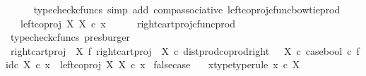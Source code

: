 \begin{isabellebody}
\ \ \ \ \isamarkupfalse%
\ {\isacharparenleft}{\kern0pt}typecheck{\isacharunderscore}{\kern0pt}cfuncs{\isacharcomma}{\kern0pt}\ simp\ add{\isacharcolon}{\kern0pt}\ comp{\isacharunderscore}{\kern0pt}associative{}\ left{\isacharunderscore}{\kern0pt}coproj{\isacharunderscore}{\kern0pt}cfunc{\isacharunderscore}{\kern0pt}bowtie{\isacharunderscore}{\kern0pt}prod{\isacharparenright}{\kern0pt}\isanewline
\ \ \isamarkupfalse%
\ \isamarkupfalse%
\ {\isachardoublequoteopen}{\isachardot}{\kern0pt}{\isachardot}{\kern0pt}{\isachardot}{\kern0pt}\ {\isacharequal}{\kern0pt}\ left{\isacharunderscore}{\kern0pt}coproj\ X\ X\ {\isasymcirc}\isactrlsub c\ x{\isachardoublequoteclose}\isanewline
\ \ \ \ \isamarkupfalse%
\ right{\isacharunderscore}{\kern0pt}cart{\isacharunderscore}{\kern0pt}proj{\isacharunderscore}{\kern0pt}cfunc{\isacharunderscore}{\kern0pt}prod\ \isamarkupfalse%
\ {\isacharparenleft}{\kern0pt}typecheck{\isacharunderscore}{\kern0pt}cfuncs{\isacharcomma}{\kern0pt}\ presburger{\isacharparenright}{\kern0pt}\isanewline
\ \ \isamarkupfalse%
\ \isamarkupfalse%
\ {\isachardoublequoteopen}{\isacharparenleft}{\kern0pt}{\isacharparenleft}{\kern0pt}right{\isacharunderscore}{\kern0pt}cart{\isacharunderscore}{\kern0pt}proj\ {\isasymone}\ X\ {\isasymbowtie}\isactrlsub f\ right{\isacharunderscore}{\kern0pt}cart{\isacharunderscore}{\kern0pt}proj\ {\isasymone}\ X{\isacharparenright}{\kern0pt}\ {\isasymcirc}\isactrlsub c\ dist{\isacharunderscore}{\kern0pt}prod{\isacharunderscore}{\kern0pt}coprod{\isacharunderscore}{\kern0pt}right\ {\isasymone}\ {\isasymone}\ X\ {\isasymcirc}\isactrlsub c\ {\isasymlangle}case{\isacharunderscore}{\kern0pt}bool\ {\isasymcirc}\isactrlsub c\ f{\isacharcomma}{\kern0pt}id\isactrlsub c\ X{\isasymrangle}{\isacharparenright}{\kern0pt}\ {\isasymcirc}\isactrlsub c\ x\ {\isacharequal}{\kern0pt}\ left{\isacharunderscore}{\kern0pt}coproj\ X\ X\ {\isasymcirc}\isactrlsub c\ x{\isachardoublequoteclose}\isacommand{{\isachardot}{\kern0pt}}\isamarkupfalse%
\isanewline
{}\isamarkupfalse%
%
\endisatagproof
{\isafoldproof}%
%
\isadelimproof
\isanewline
%
\endisadelimproof
\isanewline
{}\isamarkupfalse%
\ false{\isacharunderscore}{\kern0pt}case{\isacharcolon}{\kern0pt}\isanewline
\ \ \ x{\isacharunderscore}{\kern0pt}type{\isacharbrackleft}{\kern0pt}type{\isacharunderscore}{\kern0pt}rule{\isacharbrackright}{\kern0pt}{\isacharcolon}{\kern0pt}\ {\isachardoublequoteopen}x\ {\isasymin}\isactrlsub c\ X{\isachardoublequoteclose}\isanewline

\end{isabellebody}
